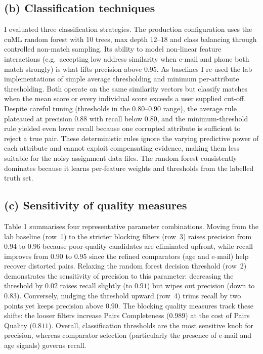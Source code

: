 \documentclass[11pt]{article}
\begin{document}
\subsection*{(b) Classification techniques}
I evaluated three classification strategies. The production configuration uses the cuML random forest with 10 trees, max depth $12$--$18$ and class balancing through controlled non-match sampling. Its ability to model non-linear feature interactions (e.g.\ accepting low address similarity when e-mail and phone both match strongly) is what lifts precision above $0.95$. As baselines I re-used the lab implementations of simple average thresholding and minimum per-attribute thresholding. Both operate on the same similarity vectors but classify matches when the mean score or every individual score exceeds a user supplied cut-off. Despite careful tuning (thresholds in the $0.80$--$0.90$ range), the average rule plateaued at precision $0.88$ with recall below $0.80$, and the minimum-threshold rule yielded even lower recall because one corrupted attribute is sufficient to reject a true pair. These deterministic rules ignore the varying predictive power of each attribute and cannot exploit compensating evidence, making them less suitable for the noisy assignment data files. The random forest consistently dominates because it learns per-feature weights and thresholds from the labelled truth set.

\subsection*{(c) Sensitivity of quality measures}
Table 1 summarises four representative parameter combinations. Moving from the lab baseline (row~1) to the stricter blocking filters (row~3) raises precision from $0.94$ to $0.96$ because poor-quality candidates are eliminated upfront, while recall improves from $0.90$ to $0.95$ since the refined comparators (age and e-mail) help recover distorted pairs. Relaxing the random forest decision threshold (row~2) demonstrates the sensitivity of precision to this parameter: decreasing the threshold by $0.02$ raises recall slightly (to $0.91$) but wipes out precision (down to $0.83$). Conversely, nudging the threshold upward (row~4) trims recall by two points yet keeps precision above $0.90$. The blocking quality measures track these shifts: the looser filters increase Pairs Completeness ($0.989$) at the cost of Pairs Quality ($0.811$). Overall, classification thresholds are the most sensitive knob for precision, whereas comparator selection (particularly the presence of e-mail and age signals) governs recall.
\end{document}
